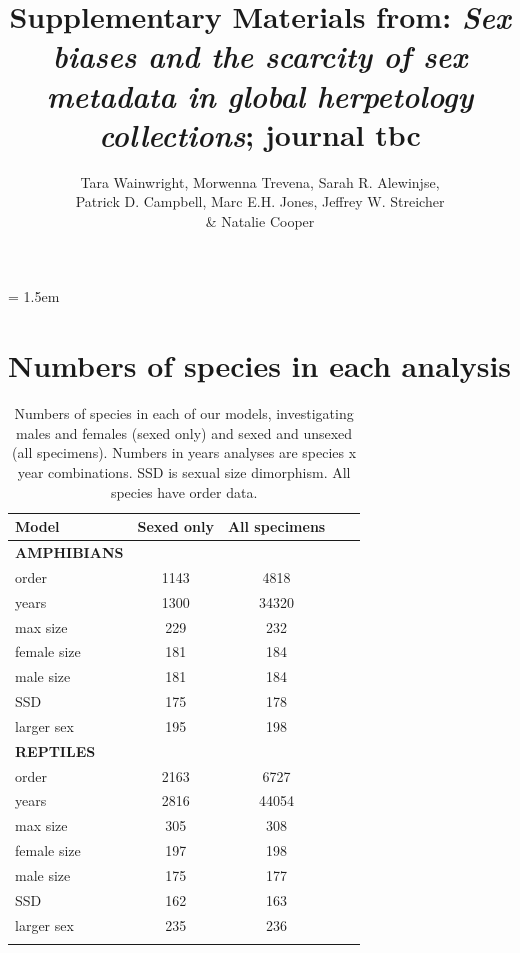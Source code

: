 \documentclass[a4paper, 12pt]{article}
\title{Supplementary Materials from: \textit{Sex biases and the scarcity of sex metadata in global herpetology collections}; journal tbc}
\author{Tara Wainwright, 
  Morwenna Trevena, 
  Sarah R. Alewinjse,\\ 
  Patrick D. Campbell,
  Marc E.H. Jones, 
  Jeffrey W. Streicher\\ \&
  Natalie Cooper}
\date{}
\begin{document}
\maketitle

\tableofcontents

\parindent = 1.5em
\addtolength{\parskip}{.3em}

\newpage
\section{Numbers of species in each analysis}
\begin{table}[H]
\centering
\begin{tabular}{lcccc}

  \hline
  \textbf{Model} & \textbf{Sexed only} & \textbf{All specimens}\\ 
  \hline
  \textbf{AMPHIBIANS} & &\\
  \hline
  order & 1143 & 4818\\
  years & 1300 & 34320\\
  max size & 229 & 232\\
  female size & 181 & 184\\
  male size & 181 & 184\\
  SSD & 175 & 178\\
  larger sex & 195 & 198\\
  \hline
  \textbf{REPTILES} & &\\
  \hline
  order & 2163 & 6727\\
  years & 2816 & 44054\\
  max size & 305 & 308\\
  female size & 197 & 198\\
  male size & 175 & 177\\
  SSD & 162 & 163\\
  larger sex & 235 & 236\\
  \hline

\label{table_numbers}
\end{tabular}
\caption{Numbers of species in each of our models, investigating males and females (sexed only) and sexed and unsexed (all specimens). Numbers in years analyses are species x year combinations. SSD is sexual size dimorphism. All species have order data.} 

\end{table}
\end{document}
